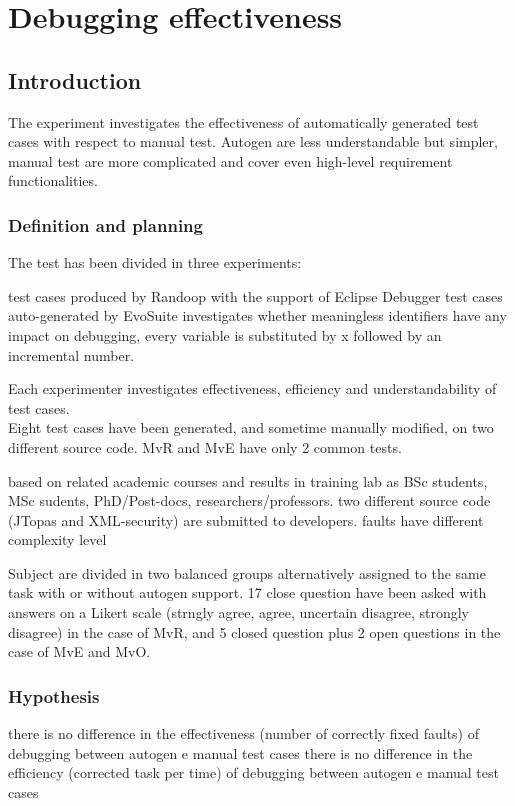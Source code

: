 \chapter{Debugging effectiveness}
\section{Introduction}
	The experiment investigates the effectiveness of automatically generated test cases with respect to manual test. Autogen are less understandable but simpler, manual test are more complicated and cover even high-level requirement functionalities. \cite{ceccato2015debuggingEffectivenessEfficiency}
	
	\subsection{Definition and planning}
	The test has been divided in three experiments:
	\begin{itemize}
		 test cases produced by Randoop with the support of Eclipse Debugger
		 test cases auto-generated by EvoSuite
		 investigates whether meaningless identifiers have any impact on debugging, every variable is substituted by x followed by an incremental number.
	\end{itemize}
	Each experimenter investigates effectiveness, efficiency and understandability of test cases.\\
	Eight test cases have been generated, and sometime manually modified, on two different source code. MvR and MvE have only 2 common tests.
	\begin{itemize}
		 based on related academic courses and results in training lab
		 as BSc students, MSc sudents, PhD/Post-docs, researchers/professors.
		 two different source code (JTopas and XML-security) are submitted to developers.
		\itembf{experiment session}
		 faults have different complexity level
	\end{itemize}
	Subject are divided in two balanced groups alternatively assigned to the same task with or without autogen support. 17 close question have been asked with answers on a Likert scale (strngly agree, agree, uncertain disagree, strongly disagree) in the case of MvR, and 5 closed question plus 2 open questions in the case of MvE and MvO.
	
	\subsection{Hypothesis}
	\begin{itemize}
		 there is no difference in the effectiveness (number of correctly fixed faults) of debugging between autogen e manual test cases
		 there is no difference in the efficiency (corrected task per time) of debugging between autogen e manual test cases
	\end{itemize}
	
